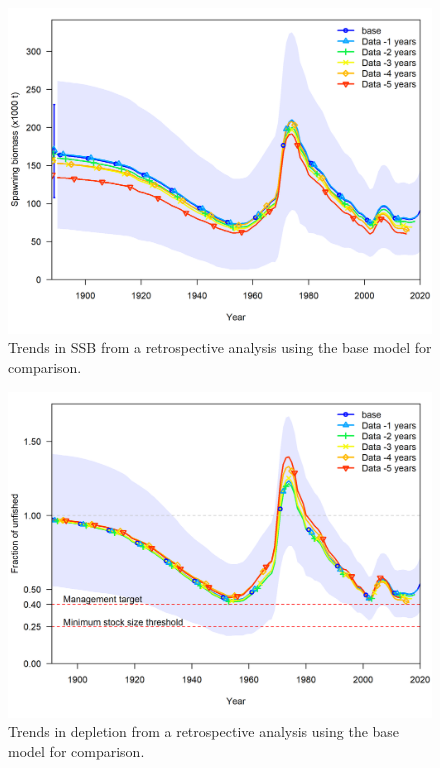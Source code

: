 \documentclass[11pt,
  english,
  a4paper,
]{article}
\begin{document}
\tagmcend\tagstructend


\begin{figure}
\centering
\includegraphics[width=1\textwidth,height=0.5\textheight]{figs/retro_base_ssb.png}
\caption{Trends in SSB from a retrospective analysis using the base model for comparison.\label{fig:retroSB}}
\end{figure}

\tagmcend\tagstructend


\begin{figure}
\centering
\includegraphics[width=1\textwidth,height=0.5\textheight]{figs/retro_base_depl.png}
\caption{Trends in depletion from a retrospective analysis using the base model for comparison.\label{fig:retroDEP}}
\end{figure}
\end{document}
